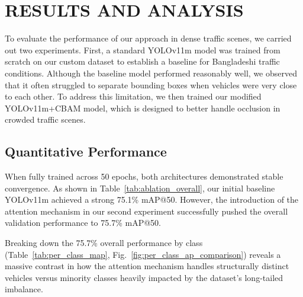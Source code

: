 \documentclass[sigconf]{acmart}
\begin{document}
\section{RESULTS AND ANALYSIS}
To evaluate the performance of our approach in dense traffic scenes, we carried out two experiments. First, a standard YOLOv11m model was trained from scratch on our custom dataset to establish a baseline for Bangladeshi traffic conditions. Although the baseline model performed reasonably well, we observed that it often struggled to separate bounding boxes when vehicles were very close to each other. To address this limitation, we then trained our modified YOLOv11m+CBAM model, which is designed to better handle occlusion in crowded traffic scenes.

\subsection{Quantitative Performance}
When fully trained across 50 epochs, both architectures demonstrated stable convergence. As shown in Table~\ref{tab:ablation_overall}, our initial baseline YOLOv11m achieved a strong 75.1\% mAP@50. However, the introduction of the attention mechanism in our second experiment successfully pushed the overall validation performance to 75.7\% mAP@50.


\begin{table}[htbp]
\caption{Overall Performance Comparison}
\centering
{}
\label{tab:ablation_overall}
\end{table}


Breaking down the 75.7\% overall performance by class (Table~\ref{tab:per_class_map}, Fig.~\ref{fig:per_class_ap_comparison}) reveals a massive contrast in how the attention mechanism handles structurally distinct vehicles versus minority classes heavily impacted by the dataset's long-tailed imbalance.
\end{document}
